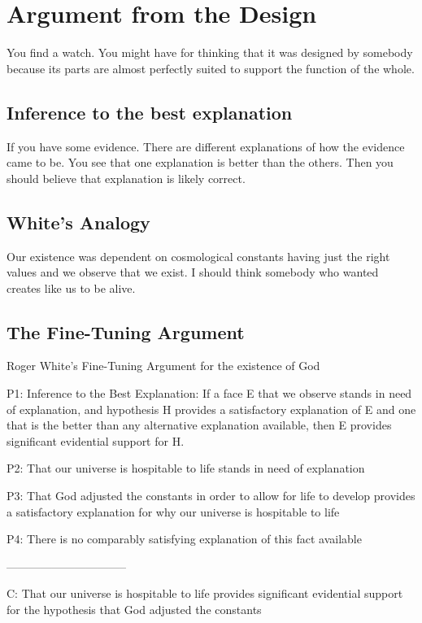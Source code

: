 \documentclass{article}
\begin{document}
\pagebreak

\section{Argument from the Design}

You find a watch. You might have for thinking that it was designed by somebody because its parts are almost perfectly suited to support the function of the whole.

\subsection{Inference to the best explanation}

If you have some evidence. There are different explanations of how the evidence came to be. You see that one explanation is better than the others. Then you should believe that explanation is likely correct.
\subsection{White's Analogy}

Our existence was dependent on cosmological constants having just the right values and we observe that we exist. I should think somebody who wanted creates like us to be alive.

\subsection{The Fine-Tuning Argument}
Roger White's Fine-Tuning Argument for the existence of God

P1: Inference to the Best Explanation: If a face E that we observe stands in need of explanation, and hypothesis H provides a satisfactory explanation of E and one that is the better than any alternative explanation available, then E provides significant evidential support for H.

P2: That our universe is hospitable to life stands in need of explanation

P3: That God adjusted the constants in order to allow for life to develop provides a satisfactory explanation for why our universe is hospitable to life

P4: There is no comparably satisfying explanation of this fact available

--------------------------------

C: That our universe is hospitable to life provides significant evidential support for the hypothesis that God adjusted the constants
\end{document}
